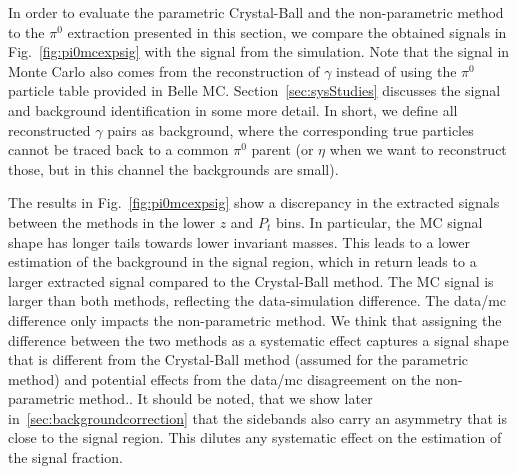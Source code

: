 In order to evaluate the parametric Crystal-Ball and the non-parametric method to the $\pi^0$ extraction presented in this section, we compare the obtained signals in Fig.~\ref{fig:pi0mcexpsig} with the signal from the simulation. 
Note that the signal in Monte Carlo also comes from the reconstruction of $\gamma$ instead of using the $\pi^0$ particle table provided in Belle MC. Section~\ref{sec:sysStudies} discusses the signal and background identification in some more detail. In short, we define all reconstructed $\gamma$ pairs as background, where the corresponding true particles cannot be traced back to a common $\pi^0$ parent (or $\eta$ when we want to reconstruct those, but in this channel the backgrounds are small). 

The results in Fig.~\ref{fig:pi0mcexpsig} show a discrepancy in the extracted signals between the methods in the lower $z$ and $P_t$ bins. In particular, the MC signal shape has longer tails towards lower invariant masses. This leads to a lower estimation of the background in the signal region, which in return leads to a larger extracted signal compared to the Crystal-Ball method. The MC signal is larger than both methods, reflecting the data-simulation difference. The data/mc difference only impacts the non-parametric method. We think that assigning the difference between the two methods as a systematic effect captures a signal shape that is different from the Crystal-Ball method (assumed for the parametric method) and potential effects from the data/mc disagreement on the non-parametric method.. It should be noted, that we show later in~\ref{sec:backgroundcorrection} that the sidebands also carry an asymmetry that is close to the signal region. This dilutes any systematic effect on the estimation of the signal fraction.


